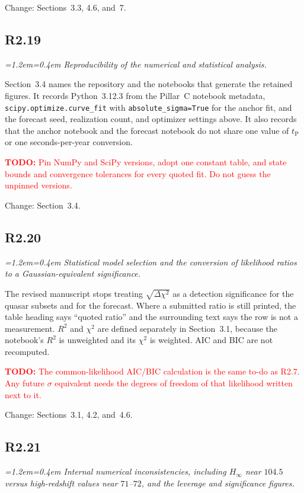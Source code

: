 \documentclass[11pt,a4paper]{article}
\newenvironment{review}{\par\color{revcolor}\itshape\leftskip=1.2em\rightskip=0.4em\noindent}{\par\leftskip=0pt\rightskip=0pt}
\newcommand{\revtodo}[1]{\textcolor{red}{\textbf{TODO:} #1}}
\begin{document}
Change: Sections~3.3, 4.6, and~7.

\subsection*{R2.19}
\begin{review}
Reproducibility of the numerical and statistical analysis.
\end{review}

Section~3.4 names the repository and the notebooks that generate the retained figures.
It records Python~3.12.3 from the Pillar~C notebook metadata, \texttt{scipy.optimize.curve\_fit} with \texttt{absolute\_sigma=True} for the anchor fit, and the forecast seed, realization count, and optimizer settings above.
It also records that the anchor notebook and the forecast notebook do not share one value of $t_{\mathrm{P}}$ or one seconds-per-year conversion.

\revtodo{Pin NumPy and SciPy versions, adopt one constant table, and state bounds and convergence tolerances for every quoted fit. Do not guess the unpinned versions.}

Change: Section~3.4.

\subsection*{R2.20}
\begin{review}
Statistical model selection and the conversion of likelihood ratios to a Gaussian-equivalent significance.
\end{review}

The revised manuscript stops treating $\sqrt{\Delta\chi^2}$ as a detection significance for the quasar subsets and for the forecast.
Where a submitted ratio is still printed, the table heading says ``quoted ratio'' and the surrounding text says the row is not a measurement.
$R^2$ and $\chi^2$ are defined separately in Section~3.1, because the notebook's $R^2$ is unweighted and its $\chi^2$ is weighted.
AIC and BIC are not recomputed.

\revtodo{The common-likelihood AIC/BIC calculation is the same to-do as R2.7. Any future $\sigma$ equivalent needs the degrees of freedom of that likelihood written next to it.}

Change: Sections~3.1, 4.2, and~4.6.

\subsection*{R2.21}
\begin{review}
Internal numerical inconsistencies, including $H_\infty$ near $104.5$ versus high-redshift values near $71$--$72$, and the leverage and significance figures.
\end{review}
\end{document}
